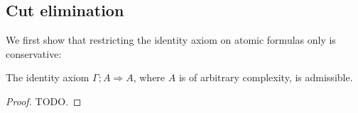 \documentclass{docs}
\begin{document}

\subsection{Cut elimination}

We first show that restricting the identity axiom on atomic formulas
only is conservative:

\begin{theorem}
  The identity axiom $\Gamma; A \Longrightarrow A$, where $A$ is of
  arbitrary complexity, is admissible.
\end{theorem}
\begin{proof}
  TODO.
\end{proof}
\end{document}
